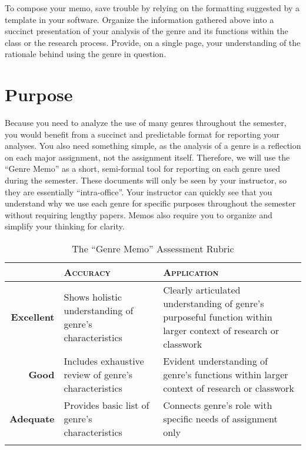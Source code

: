 \documentclass[10pt, oneside, twocolumn]{amsart}	%
\begin{document}
To compose your memo, save trouble by relying on the formatting suggested by a template in your software. Organize the information gathered above into a succinct presentation of your analysis of the genre and its functions within the class or the research process. Provide, on a single page, your understanding of the rationale behind using the genre in question.


\newpage

\section{Purpose} %
\label{sec:purpose}
Because you need to analyze the use of many genres throughout the semester, you would benefit from a succinct and predictable format for reporting your analyses. You also need something simple, as the analysis of a genre is a reflection on each major assignment, not the assignment itself. Therefore, we will use the ``Genre Memo'' as a short, semi-formal tool for reporting on each genre used during the semester. These documents will only be seen by your instructor, so they are essentially ``intra-office''. Your instructor can quickly see that you understand why we use each genre for specific purposes throughout the semester without requiring lengthy papers. Memos also require you to organize and simplify your thinking for clarity.


\begin{table}[b]
\small
	\caption{The ``Genre Memo'' Assessment Rubric}\label{tab:rubric}
\begin{tabulary}{\columnwidth}{rLL}
	\toprule  & \textbf{\textsc{Accuracy}} & \textbf{\textsc{Application}} \\


\midrule \textbf{Excellent} & Shows holistic understanding of genre's characteristics & Clearly articulated understanding of genre's purposeful function within larger context of research or classwork	\\
\midrule \textbf{Good} & Includes exhaustive review of genre's characteristics & Evident understanding of genre's functions within larger context of research or classwork 	\\
\midrule \textbf{Adequate} & Provides basic list of genre's characteristics & Connects genre's role with specific needs of assignment only	\\


	\bottomrule\\
\end{tabulary}
\end{table}
\end{document}

